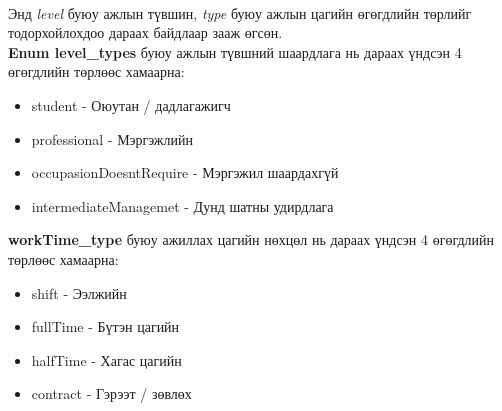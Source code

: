 \\Энд \textit{level} буюу ажлын түвшин, \textit{type} буюу ажлын цагийн өгөгдлийн төрлийг тодорхойлохдоо дараах байдлаар зааж өгсөн.
\\\textbf{Enum level\_types} буюу ажлын түвшний шаардлага нь дараах үндсэн 4 өгөгдлийн төрлөөс хамаарна:
\begin{itemize}
  \item student - Оюутан / дадлагажигч
  \item professional - Мэргэжлийн
  \item occupasionDoesntRequire - Мэргэжил шаардахгүй
  \item intermediateManagemet - Дунд шатны удирдлага
\end{itemize}
\textbf{workTime\_type} буюу ажиллах цагийн нөхцөл нь дараах үндсэн 4 өгөгдлийн төрлөөс хамаарна:
\begin{itemize}
  \item shift - Ээлжийн
  \item fullTime - Бүтэн цагийн
  \item halfTime - Хагас цагийн
  \item contract - Гэрээт / зөвлөх
\end{itemize}

